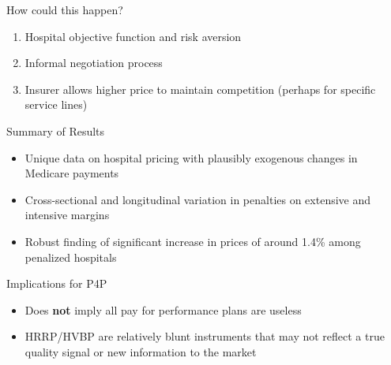 \documentclass[t]{beamer}
\begin{document}
\begin{frame}{How could this happen?}
    \begin{enumerate}
        \item Hospital objective function and risk aversion
        \item Informal negotiation process
        \item Insurer allows higher price to maintain competition (perhaps for specific service lines)
    \end{enumerate}
\end{frame}

\begin{frame}{Summary of Results}
    \begin{itemize}
        \item Unique data on hospital pricing with plausibly exogenous changes in Medicare payments
        \item Cross-sectional and longitudinal variation in penalties on extensive and intensive margins
        \item Robust finding of significant increase in prices of around 1.4\% among penalized hospitals
    \end{itemize}
\end{frame}

\begin{frame}{Implications for P4P}
    \begin{itemize}
        \item Does \textbf{not} imply all pay for performance plans are useless
        \item HRRP/HVBP are relatively blunt instruments that may not reflect a true quality signal or new information to the market
    \end{itemize}
\end{frame}
\end{document}
